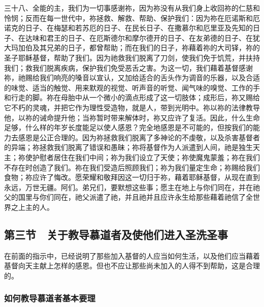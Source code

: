 三十八、全能的主，我们为一切事感谢祢，因为祢没有从我们身上收回祢的仁慈和怜悯；反而在每一世代中，祢拯救、解救、帮助、保护我们：因为祢在厄诺斯和厄诺克的日子、在梅瑟和若苏厄的日子、在民长日子、在撒慕尔和厄里亚及先知的日子、在达味和君王的日子、在厄斯德尔和摩尔德开的日子、在友弟德的日子、在犹大玛加伯及其兄弟的日子，都曾帮助；而在我们的日子，祢藉着祢的大司铎，祢的圣子耶稣基督，帮助了我们。因为祂救我们脱离了刀剑，使我们免于饥荒，并扶持我们；救我们脱离疾病，保护我们免受恶舌之害。为这一切，我们藉着基督感谢祢，祂赐给我们响亮的嗓音以宣认，又加给适合的舌头作为调音的乐器，以及合适的味觉、适当的触觉、用来默观的视觉、听声音的听觉、闻气味的嗅觉、工作的手和行走的脚。祢在母胎中从一个微小的滴点形成了这一切肢体；成形后，祢又赐给它不朽的灵魂，并把它作为理性受造物，就是人，带到光明中。祢以祢的法律教导他，以祢的诫命提升他；当祢暂时带来解体时，祢又应许了复活。因此，什么生命足够，什么样的年岁长度能足以使人感恩？完全地感恩是不可能的，但按我们的能力去感恩是公正合理的。因为祢拯救我们脱离了多神论的不虔敬，以及杀害基督者的异端；祢拯救我们脱离了错误和愚昧；祢将基督作为人派遣到人间，祂是独生天主；祢使护慰者居住在我们中间；祢为我们设立了天使；祢使魔鬼蒙羞；祢在我们不存在时创造了我们。祢在我们受造后照顾我们；祢为我们量定生命；祢赐给我们食物；祢应许了悔改。愿荣耀和敬拜因这一切归于祢，藉着耶稣基督，从现在直到永远，万世无疆。阿们。弟兄们，要默想这些事；愿主在地上与你们同在，并在祂父的国里与你们同在，祂父派遣了祂，并且祂并且应许永生给那些藉着祂信了全世界之上主的人。\par


\subsection{第三节　关于教导慕道者及使他们进入圣洗圣事}

在前面的指示中，已经说明了那些加入基督的人应当如何生活，以及他们应当藉着基督向天主献上怎样的感恩。但也不应让那些尚未加入的人得不到帮助，这是合理的。\par


\subsubsection{如何教导慕道者基本要理}


